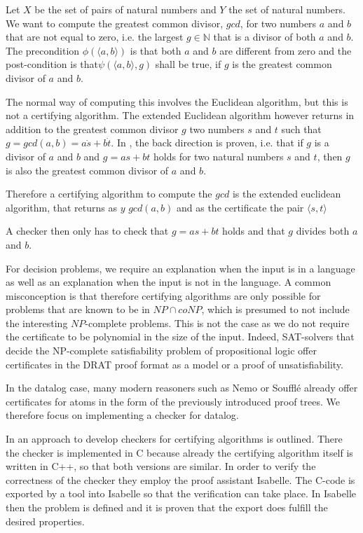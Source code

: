 \begin{example}
    Let $X$ be the set of pairs of natural numbers and $Y$ the set of natural numbers. We want to compute the greatest common divisor, $gcd$, for two numbers $a$ and $b$ that are not equal to zero, i.e. the largest $g \in \mathbb{N}$ that is a divisor of both $a$ and $b$. The precondition $\phi(\langle a, b\rangle)$ is that both $a$ and $b$ are different from zero and the post-condition is that$\psi(\langle a, b\rangle, g)$ shall be true, if $g$ is the greatest common divisor of $a$ and $b$.

    The normal way of computing this involves the Euclidean algorithm, but this is not a certifying algorithm. The extended Euclidean algorithm however returns in addition to the greatest common divisor $g$ two numbers $s$ and $t$ such that $g = gcd(a,b) = a \dot s + b \dot t$. In \cite{CertAlg}, the back direction is proven, i.e. that if $g$ is a divisor of $a$ and $b$ and $g = a s + b  t$ holds for two natural numbers $s$ and $t$, then $g$ is also the greatest common divisor of $a$ and $b$.

    Therefore a certifying algorithm to compute the $gcd$ is the extended euclidean algorithm, that returns as $y$ $gcd(a,b)$ and as the certificate the pair $\langle s, t\rangle$

    A checker then only has to check that $g=a s + b t$ holds and that $g$ divides both $a$ and $b$. 
\end{example}

For decision problems, we require an explanation when the input is in a language as well as an explanation when the input is not in the language. A common misconception is that therefore certifying algorithms are only possible for problems that are known to be in $NP \cap coNP$, which is presumed to not include the interesting $NP$-complete problems. This is not the case as we do not require the certificate to be polynomial in the size of the input. Indeed, SAT-solvers that decide the NP-complete satisfiability problem of propositional logic offer certificates in the DRAT proof format as a model or a proof of unsatisfiability\cite{DRAT}.

In the datalog case, many modern reasoners such as Nemo or Soufflé already offer certificates for atoms in the form of the previously introduced proof trees. We therefore focus on implementing a checker for datalog.

In \cite{CertCheckerWorkflow} an approach to develop checkers for certifying algorithms is outlined. There the checker is implemented in C because already the certifying algorithm itself is written in C++, so that both versions are similar. In order to verify the correctness of the checker they employ the proof assistant Isabelle. The C-code is exported by a tool into Isabelle so that the verification can take place. In Isabelle then the problem is defined and it is proven that the export does fulfill the desired properties. 

